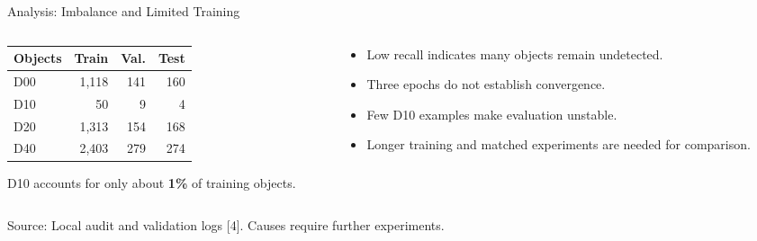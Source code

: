 \documentclass[aspectratio=169,11pt]{beamer}
\newcommand{\source}[1]{\par\vfill{\fontsize{7}{9}\selectfont\color{muted}Source: #1\par}}
\begin{document}
\begin{frame}{Analysis: Imbalance and Limited Training}\small
\begin{columns}[T]
\begin{column}{.45\textwidth}
\small\renewcommand{\arraystretch}{1.55}
\begin{tabular}{lrrr}\toprule
\textbf{Objects}&\textbf{Train}&\textbf{Val.}&\textbf{Test}\\\midrule
D00&1,118&141&160\\
D10&50&9&4\\
D20&1,313&154&168\\
D40&2,403&279&274\\\bottomrule
\end{tabular}
\medskip\par
D10 accounts for only about \textbf{1\%} of training objects.
\end{column}
\begin{column}{.51\textwidth}
\begin{itemize}\setlength\itemsep{3mm}
\item Low recall indicates many objects remain undetected.
\item Three epochs do not establish convergence.
\item Few D10 examples make evaluation unstable.
\item Longer training and matched experiments are needed for comparison.
\end{itemize}
\end{column}
\end{columns}
\source{Local audit and validation logs [4]. Causes require further experiments.}
\end{frame}
\end{document}
